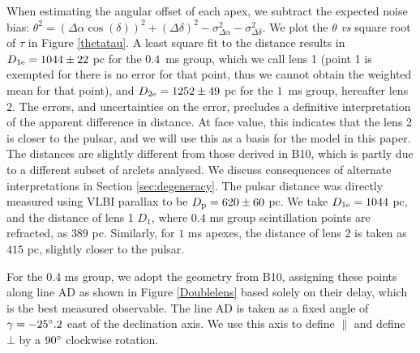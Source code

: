 \documentclass[useAMS,usenatbib]{mn2e}
\begin{document}
When estimating the angular offset of each apex,
we subtract the expected noise bias:
${\theta}^2=({\Delta\alpha}\cos(\delta))^2+({\Delta\delta})^2-\sigma^2_{\Delta\alpha}-\sigma^2_{\Delta\delta}$. 
We plot the $\theta$ {\it vs} square root of $\tau$ in Figure
\ref{thetatau}. A least square fit to the distance results in
$D_{1{\rm e}}=1044\pm 22$ pc for the  $0.4$\ ms group, which we call lens 1 (point 1 is exempted for there is no error for that point, thus we cannot obtain the weighted mean for that point), and
$D_{2{\rm e}} = 1252 \pm 49$ pc for the $1$\ ms group, hereafter lens 2.
The errors, and uncertainties on the error, precludes a definitive
interpretation of the apparent difference in distance.  At face value, 
this indicates that the lens 2 is closer to the pulsar, and we will
use this as a basis for the model in this paper.  
The distances are slightly different from those derived in
B10, which is partly due to a different subset
of arclets analysed. We discuss
consequences of alternate interpretations in Section \ref{sec:degeneracy}.
The pulsar distance was directly measured using VLBI parallax to be
$D_{\rm p} = 620 \pm 60$ pc.  
We take $D_{1{\rm e}}=1044$ pc,  and the distance of lens 1 $D_{1}$,
where $0.4$ ms group scintillation points are refracted, as $389$
pc. Similarly, for $1$ ms apexes, the distance of lens 2 is taken as $415$ pc,
slightly closer to the pulsar.


For the 0.4 ms group, we adopt the geometry from
B10, assigning these points along line AD as
shown in Figure \ref{Doublelens} based solely on their delay, which is
the best measured observable. The line AD is taken as a
fixed angle of $\gamma=-25\degree.2$ east of the
declination axis. We use this axis
to define ${\parallel}$ and define ${\bot}$ by a $90\degree$ clockwise
rotation.  
\end{document}
